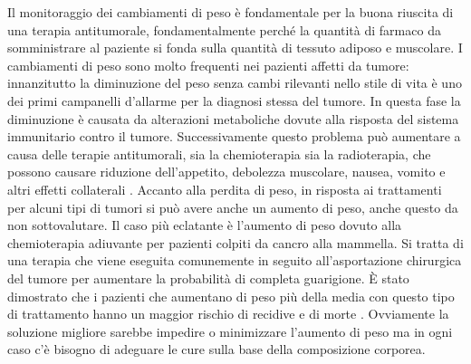 Il monitoraggio dei cambiamenti di peso è fondamentale per la buona riuscita di una terapia antitumorale, fondamentalmente perché la quantità di farmaco da somministrare al paziente si fonda sulla quantità di tessuto adiposo e muscolare. I cambiamenti di peso sono molto frequenti nei pazienti affetti da tumore: innanzitutto la diminuzione del peso senza cambi rilevanti nello stile di vita è uno dei primi campanelli d’allarme per la diagnosi stessa del tumore. In questa fase la diminuzione è causata da alterazioni metaboliche dovute alla risposta del sistema immunitario contro il tumore. Successivamente questo problema può aumentare a causa delle terapie antitumorali, sia la chemioterapia sia la radioterapia, che possono causare riduzione dell'appetito, debolezza muscolare, nausea, vomito e altri effetti collaterali \cite{aimac}. Accanto alla perdita di peso, in risposta ai trattamenti per alcuni tipi di tumori si può avere anche un aumento di peso, anche questo da non sottovalutare. Il caso più eclatante è l’aumento di peso dovuto alla chemioterapia adiuvante per pazienti colpiti da cancro alla mammella. Si tratta di una terapia che viene eseguita comunemente in seguito all'asportazione chirurgica del tumore per aumentare la probabilità di completa guarigione. È stato dimostrato che i pazienti che aumentano di peso più della media con questo tipo di trattamento hanno un maggior rischio di recidive e di morte \cite{Camoriano1990}. Ovviamente la soluzione migliore sarebbe impedire o minimizzare l’aumento di peso ma in ogni caso c’è bisogno di adeguare le cure sulla base della composizione corporea.